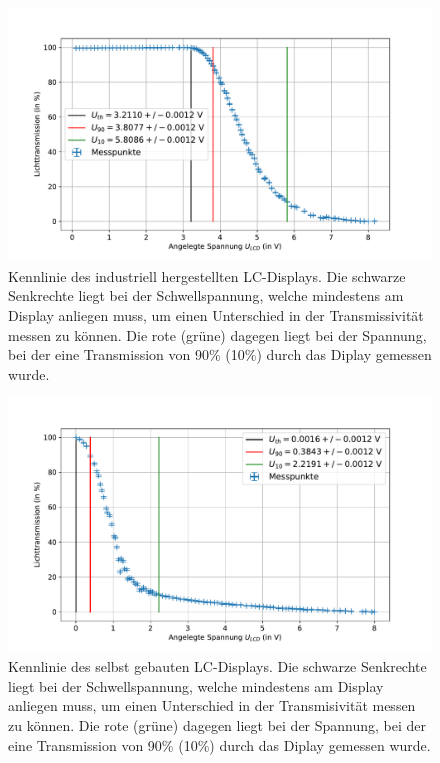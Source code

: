 \documentclass[
	a4paper,
	12pt,
	pagesize,
	ngerman
]{scrartcl}
\begin{document}
	\begin{figure}[H]
			\includegraphics[width=1\linewidth]{images/industry.pdf}
			\caption{Kennlinie des industriell hergestellten LC-Displays.
			Die schwarze Senkrechte liegt bei der Schwellspannung, welche mindestens am Display anliegen muss, um einen Unterschied in der Transmissivität messen zu können.
			Die rote (grüne) dagegen liegt bei der Spannung, bei der eine Transmission von 90\% (10\%) durch das Diplay gemessen wurde.
			}
			\label{fig_industry}
	\end{figure}
	\begin{figure}[H]
			\includegraphics[width=1\linewidth]{images/selfmade.pdf}
			\caption{Kennlinie des selbst gebauten LC-Displays.
			Die schwarze Senkrechte liegt bei der Schwellspannung, welche mindestens am Display anliegen muss, um einen Unterschied in der Transmisivität messen zu können.
			Die rote (grüne) dagegen liegt bei der Spannung, bei der eine Transmission von 90\% (10\%) durch das Diplay gemessen wurde.
			}
			\label{fig_selfmade}
	\end{figure}
\end{document}
